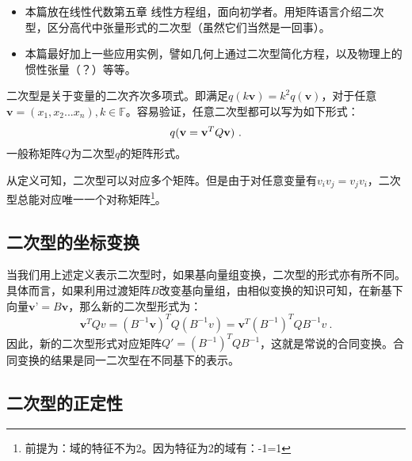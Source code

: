 

\begin{issues}
\issueTODO 
\begin{itemize}
\item 本篇放在线性代数第五章 线性方程组，面向初学者。用矩阵语言介绍二次型，区分高代中张量形式的二次型（虽然它们当然是一回事）。
\item  本篇最好加上一些应用实例，譬如几何上通过二次型简化方程，以及物理上的惯性张量（？）等等。
\end{itemize}
\end{issues}
\begin{definition}{}
二次型是关于变量的二次齐次多项式。即满足$q(k\textbf{v})=k^2 q(\textbf{v})$，对于任意$\textbf{v}=(x_1,x_2...x_n),k\in \mathbb F$。容易验证，任意二次型都可以写为如下形式：
\begin{equation}
q(\textbf{v}=\textbf{v}^TQ\textbf v)~.
\end{equation}
一般称矩阵$Q$为二次型$q$的矩阵形式。
\end{definition}
从定义可知，二次型可以对应多个矩阵。但是由于对任意变量有$v_iv_j=v_jv_i$，二次型总能对应唯一一个对称矩阵\footnote{前提为：域的特征不为2。因为特征为2的域有：-1=1}。
\subsection{二次型的坐标变换}
当我们用上述定义表示二次型时，如果基向量组变换，二次型的形式亦有所不同。具体而言，如果利用过渡矩阵$B$改变基向量组，由相似变换的知识可知，在新基下向量$\textbf {v'}=B\textbf{v}$，那么新的二次型形式为：
\begin{equation}
\textbf{v}^T Qv=(B^{-1}\textbf{v})^T Q(B^{-1}v)=\textbf{v}^T (B^{-1})^{T}QB^{-1}v~.
\end{equation}
因此，新的二次型形式对应矩阵$Q'=(B^{-1})^{T}QB^{-1}$，这就是常说的合同变换。合同变换的结果是同一二次型在不同基下的表示。

\subsection{二次型的正定性}